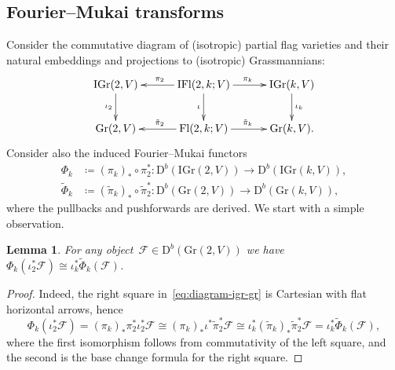 \documentclass[a4paper]{article}
\newcommand{\Gr}{\mathrm{Gr}}
\newcommand{\IGr}{\mathrm{IGr}}
\newcommand{\IFl}{\mathrm{IFl}}
\newcommand{\Fl}{\mathrm{Fl}}
\newcommand{\Db}{{\mathrm{D}^b}}
\newcommand{\cF}{\mathcal{F}}
\newtheorem{lemma}[theorem]{Lemma}
\theoremstyle{remark}
\theoremstyle{definition}
\begin{document}
\subsection{Fourier--Mukai transforms}
\label{ss:fm}

Consider the commutative diagram of (isotropic) partial flag varieties
and their natural embeddings and projections to (isotropic) Grassmannians:
\begin{equation}
\label{eq:diagram-igr-gr}
\vcenter{
\xymatrix@C=3em{
\IGr(2,V) \ar[d]_{\iota_2} &
\IFl(2,k;V) \ar[d]_{\iota} \ar[l]_{\pi_2} \ar[r]^{\pi_k} &
\IGr(k,V) \ar[d]^{\iota_k} 
\\
\Gr(2,V) &
\Fl(2,k;V) \ar[l]_{\tilde\pi_2} \ar[r]^{\tilde\pi_k} &
\Gr(k,V).
}}
\end{equation}
Consider also the induced Fourier--Mukai functors
\begin{align*}
\Phi_k & \coloneqq (\pi_k)_* \circ \pi_2^* \colon \Db(\IGr(2,V)) \to \Db(\IGr(k,V)),\\
\tilde\Phi_k & \coloneqq (\tilde\pi_k)_* \circ \tilde\pi_2^* \colon \Db(\Gr(2,V)) \to \Db(\Gr(k,V)),
\end{align*}
where the pullbacks and pushforwards are derived.
We start with a simple observation.

\begin{lemma}
\label{lem:phi-tphi}
For any object~\mbox{\(\cF \in \Db(\Gr(2,V))\)} we have~\(\Phi_k(\iota_2^*\cF) \cong \iota_k^*\tilde\Phi_k(\cF)\).
\end{lemma}

\begin{proof}
Indeed, the right square in~\eqref{eq:diagram-igr-gr} is Cartesian with flat horizontal arrows, hence
\begin{equation*}
\Phi_k(\iota_2^*\cF) =
(\pi_k)_*\pi_2^*\iota_2^*\cF \cong
(\pi_k)_*\iota^*\tilde\pi_2^*\cF \cong
\iota_k^*(\tilde\pi_k)_*\tilde\pi_2^*\cF =
\iota_k^*\tilde\Phi_k(\cF),
\end{equation*}
where the first isomorphism follows from commutativity of the left square,
and the second is the base change formula for the right square.
\end{proof}
\end{document}
